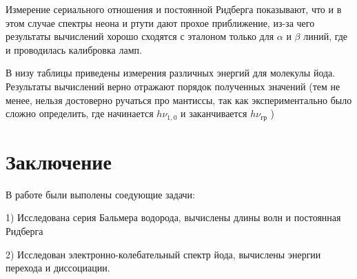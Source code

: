 \documentclass[%
 reprint,
 amsmath,amssymb,
 aps,
]{revtex4-2}
\begin{document}
Измерение сериального отношения и постоянной Ридберга показывают, что и в этом случае спектры неона и ртути дают прохое приближение, из-за чего результаты вычислений хорошо сходятся с эталоном только для $\alpha$ и $\beta$ линий, где и проводилась калибровка ламп.

В низу таблицы приведены измерения различных энергий для молекулы йода. Результаты вычислений верно отражают порядок полученных значений (тем не менее, нельзя достоверно ручаться про мантиссы, так как экспериментально было сложно определить, где начинается $h\nu_{1,0}$ и заканчивается $h\nu_\text{гр}$ )

\section{Заключение}

В работе были выполены соедующие задачи:

1) Исследована серия Бальмера водорода, вычислены длины волн и постоянная Ридберга

2) Исследован электронно-колебательный спектр йода, вычислены энергии перехода и диссоциации.
\end{document}
